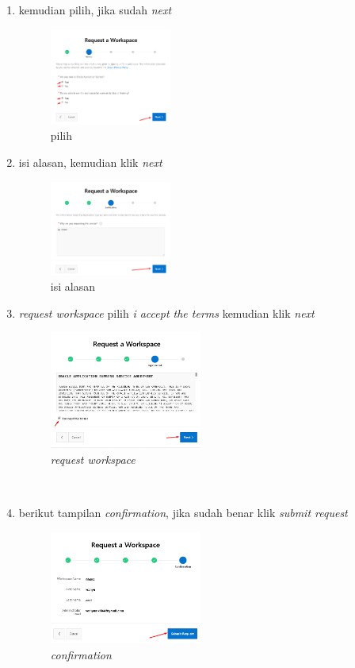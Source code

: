 \documentclass{article}
\begin{document}
\begin{enumerate}
\item kemudian pilih, jika sudah \textit{next}
    \begin{figure}[ht]
        \centerline{\includegraphics[width=4cm]{d.png}}
        \caption{pilih}
    \end{figure}

\item isi alasan, kemudian klik \textit{next}
    \begin{figure}[ht]
        \centerline{\includegraphics[width=4cm]{e.png}}
        \caption{isi alasan}
    \end{figure}
    
\newpage

\item \textit{request workspace} pilih \textit{i accept the terms} kemudian klik \textit{next}
     \begin{figure}[htb]
        \centerline{\includegraphics[width=5cm]{f.png}}
        \caption{\textit{request workspace}}
    \end{figure} \\
    
    \item berikut tampilan \textit{confirmation}, jika sudah benar klik \textit{submit request}
    \begin{figure}[ht]
        \centerline{\includegraphics[width=5cm]{g.png}}
        \caption{\textit{confirmation}}
    \end{figure}


\end{enumerate}
\end{document}
